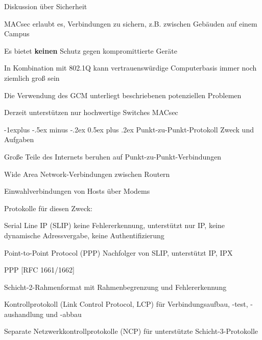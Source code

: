 \documentclass[a4paper]{article}
\makeatletter
\renewcommand{\subsection}{\@startsection{subsection}{2}{0mm}%
 {-1explus -.5ex minus -.2ex}%
 {0.5ex plus .2ex}%
 {\normalfont\normalsize\bfseries}}
\makeatother
\begin{document}
\begin{multicols}{3}
      Diskussion über Sicherheit
      \begin{itemize*}
            \item MACsec erlaubt es, Verbindungen zu sichern, z.B. zwischen Gebäuden auf einem Campus
            \item Es bietet \textbf{keinen} Schutz gegen kompromittierte Geräte
            \item In Kombination mit 802.1Q kann vertrauenswürdige Computerbasis immer noch ziemlich groß sein
            \item Die Verwendung des GCM unterliegt beschriebenen potenziellen Problemen
            \item Derzeit unterstützen nur hochwertige Switches MACsec
      \end{itemize*}

      \subsection{Punkt-zu-Punkt-Protokoll}
      Zweck und Aufgaben
      \begin{itemize*}
            \item Große Teile des Internets beruhen auf Punkt-zu-Punkt-Verbindungen
            \begin{itemize*}
                  \item Wide Area Network-Verbindungen zwischen Routern
                  \item Einwahlverbindungen von Hosts über Modems
            \end{itemize*}
            \item Protokolle für diesen Zweck:
            \begin{description*}
                  \item[Serial Line IP] (SLIP) keine Fehlererkennung, unterstützt nur IP, keine dynamische Adressvergabe, keine Authentifizierung
                  \item[Point-to-Point Protocol (PPP)] Nachfolger von SLIP, unterstützt IP, IPX
            \end{description*}
            \item PPP [RFC 1661/1662]
            \begin{itemize*}
                  \item Schicht-2-Rahmenformat mit Rahmenbegrenzung und Fehlererkennung
                  \item Kontrollprotokoll (Link Control Protocol, LCP) für Verbindungsaufbau, -test, -aushandlung und -abbau
                  \item Separate Netzwerkkontrollprotokolle (NCP) für unterstützte Schicht-3-Protokolle
            \end{itemize*}
      \end{itemize*}


\end{multicols}
\end{document}
